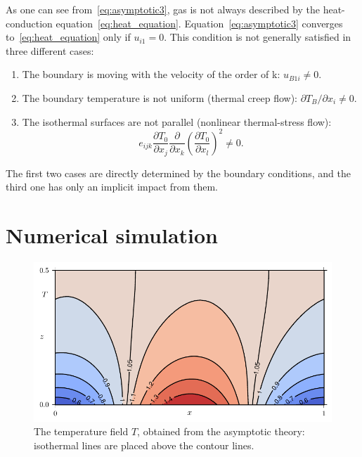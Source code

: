 \documentclass[smallextended, referee]{svjour3} %
\newcommand{\pder}[2][]{\frac{\partial#1}{\partial#2}}
\newcommand{\Pder}[2][]{\partial#1/\partial#2}
\begin{document}
As one can see from~\eqref{eq:asymptotic3}, gas is not always described
by the heat-conduction equation~\eqref{eq:heat_equation}.
Equation~\eqref{eq:asymptotic3} converges to~\eqref{eq:heat_equation} only if \(u_{i1} = 0\).
This condition is not generally satisfied in three different cases:
\begin{enumerate}
	\item The boundary is moving with the velocity of the order of k: \(u_{B1i} \neq 0 \).
	\item The boundary temperature is not uniform (thermal creep flow): \(\Pder[T_B]{x_i} \neq 0 \).
	\item The isothermal surfaces are not parallel (nonlinear thermal-stress flow):
		\begin{equation}\label{eq:equilibrium}
			e_{ijk}\pder[T_0]{x_j}\pder{x_k}\left(\pder[T_0]{x_l}\right)^2 \neq 0.
		\end{equation}
\end{enumerate}

The first two cases are directly determined by the boundary conditions,
and the third one has only an implicit impact from them.

\section{Numerical simulation}

\begin{figure}[ht]
	\centering
	\includegraphics{Fig3}
	\caption{The temperature field \(T\), obtained from the asymptotic theory:
		isothermal lines are placed above the contour lines.}
	\label{fig:moving:T_asym}
\end{figure}
\end{document}
